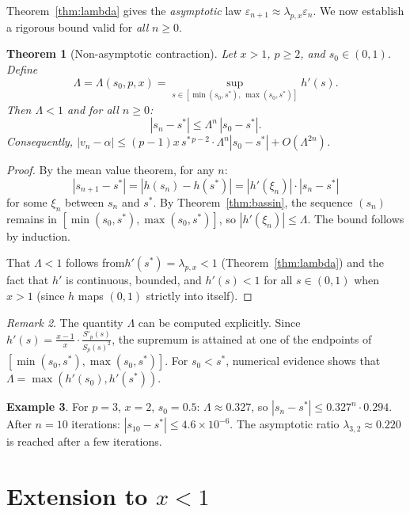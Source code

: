 \documentclass[10pt,a4paper,oneside]{book}
\newtheorem{theorem}{Theorem}[chapter]
\theoremstyle{definition}
\newtheorem{example}[theorem]{Example}
\theoremstyle{remark}
\newtheorem{remark}[theorem]{Remark}
\newcommand{\eps}{\varepsilon}
\begin{document}
Theorem~\ref{thm:lambda} gives the \emph{asymptotic} law $\eps_{n+1} \approx \lambda_{p,x} \eps_n$. We now establish a rigorous bound valid for \emph{all} $n \geq 0$.

\begin{theorem}[Non-asymptotic contraction]
\label{thm:nonasymp}
Let $x > 1$, $p \geq 2$, and $s_0 \in (0,1)$. Define
\[
  \Lambda = \Lambda(s_0, p, x) = \sup_{s \in [\min(s_0, s^*),\, \max(s_0, s^*)]} h'(s).
\]
Then $\Lambda < 1$ and for all $n \geq 0$:
\begin{equation}
  \label{eq:nonasymp_bound}
  |s_n - s^*| \leq \Lambda^n \, |s_0 - s^*|.
\end{equation}
Consequently, $|v_n - \alpha| \leq (p-1) x\, s^{*\,p-2} \cdot \Lambda^n |s_0 - s^*| + O(\Lambda^{2n})$.
\end{theorem}

\begin{proof}
By the mean value theorem, for any $n$:
\[
  |s_{n+1} - s^*| = |h(s_n) - h(s^*)| = |h'(\xi_n)| \cdot |s_n - s^*|
\]
for some $\xi_n$ between $s_n$ and $s^*$. By Theorem~\ref{thm:bassin}, the sequence $(s_n)$ remains in $[\min(s_0,s^*), \max(s_0,s^*)]$, so $|h'(\xi_n)| \leq \Lambda$. The bound follows by induction.

That $\Lambda < 1$ follows from$h'(s^*) = \lambda_{p,x} < 1$ (Theorem~\ref{thm:lambda}) and the fact that $h'$ is continuous, bounded, and $h'(s) < 1$ for all $s \in (0,1)$ when $x > 1$ (since $h$ maps $(0,1)$ strictly into itself).
\end{proof}

\begin{remark}
The quantity $\Lambda$ can be computed explicitly. Since $h'(s) = \frac{x-1}{x} \cdot \frac{S'_p(s)}{S_p(s)^2}$, the supremum is attained at one of the endpoints of $[\min(s_0, s^*), \max(s_0, s^*)]$. For $s_0 < s^*$, numerical evidence shows that $\Lambda = \max(h'(s_0), h'(s^*))$.
\end{remark}

\begin{example}
For $p = 3$, $x = 2$, $s_0 = 0.5$: $\Lambda \approx 0.327$, so $|s_n - s^*| \leq 0.327^n \cdot 0.294$. After $n = 10$ iterations: $|s_{10} - s^*| \leq 4.6 \times 10^{-6}$. The asymptotic ratio $\lambda_{3,2} \approx 0.220$ is reached after a few iterations.
\end{example}

\section{Extension to \texorpdfstring{$x < 1$}{x < 1}}
\label{sec:extension_x_less_1}
\end{document}
